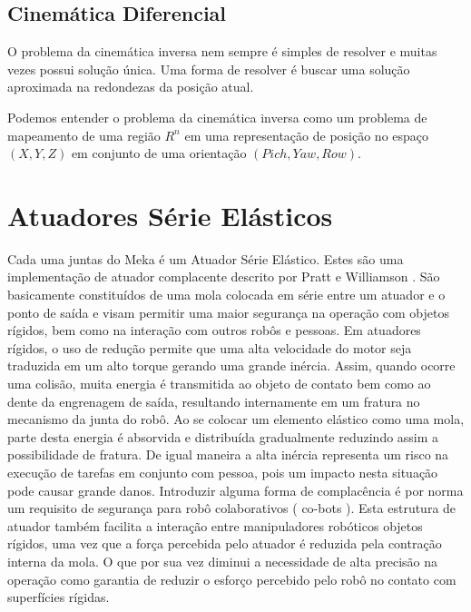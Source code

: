 \subsection{Cinemática Diferencial}

O problema da cinemática inversa nem sempre é simples de resolver e muitas vezes possui solução única. Uma forma de resolver é buscar uma solução aproximada na redondezas da posição atual.

Podemos entender o problema da cinemática inversa como um problema de mapeamento de uma região $R^n$ em uma representação de posição no espaço $(X,Y,Z)$ em conjunto de uma orientação $(Pich, Yaw, Row)$.


\section{Atuadores Série Elásticos}

Cada uma juntas do Meka é um Atuador Série Elástico. Estes são uma implementação de atuador complacente descrito por Pratt e Williamson \cite{pratt1995series}. São basicamente constituídos de uma mola colocada em série entre um atuador e o ponto de saída e visam permitir uma maior segurança na operação com objetos rígidos, bem como na interação com outros robôs e pessoas. Em atuadores rígidos, o uso de redução permite que uma alta velocidade do motor seja traduzida em um alto torque gerando uma grande inércia. Assim, quando ocorre uma colisão, muita energia é transmitida ao objeto de contato bem como ao dente da engrenagem de saída, resultando internamente em um fratura no mecanismo da junta do robô. Ao se colocar um elemento elástico como uma mola, parte desta energia é absorvida e distribuída gradualmente reduzindo assim a possibilidade de fratura. De igual maneira a alta inércia representa um risco na execução de tarefas em conjunto com pessoa, pois um impacto nesta situação pode causar grande danos. Introduzir alguma forma de complacência é por norma \cite{nobody} um requisito de segurança para robô colaborativos ( co-bots ). Esta estrutura de atuador também facilita a interação entre manipuladores robóticos objetos rígidos, uma vez que a força percebida pelo atuador é reduzida pela contração interna da mola. O que por sua vez diminui a necessidade de alta precisão na operação como garantia de reduzir o esforço percebido pelo robô no contato com superfícies rígidas.

